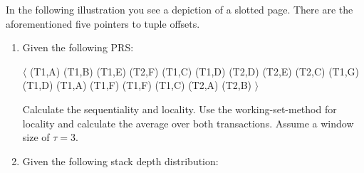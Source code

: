 In the following illustration you see a depiction of a slotted page. There are the aforementioned five pointers to tuple offsets. 


\newpage


\begin{enumerate}
  \item Given the following PRS:

        \begin{center}
          $\langle$ (T1,A) (T1,B) (T1,E) (T2,F) (T1,C) (T1,D) (T2,D) (T2,E) (T2,C) (T1,G) (T1,D) (T1,A) (T1,F) (T1,F) (T1,C) (T2,A) (T2,B) $\rangle$
        \end{center}
        Calculate the sequentiality and locality.
        Use the working-set-method for locality and calculate the average over both transactions.
        Assume a window size of $\tau = 3$.

  \item Given the following stack depth distribution:


\end{enumerate}
